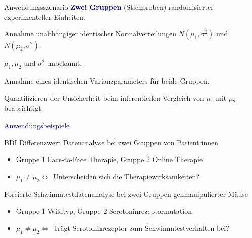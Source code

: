 \documentclass[
  8pt,
  ignorenonframetext,
]{beamer}
\providecommand{\tightlist}{%
  \setlength{\itemsep}{0pt}\setlength{\parskip}{0pt}}
\begin{document}
\begin{frame}{Anwendungsszenario}
\protect\hypertarget{anwendungsszenario-6}{}
\textbf{\textcolor{darkblue}{Zwei Gruppen}} (Stichproben) randomisierter
experimenteller Einheiten.

Annahme unabhängiger identischer Normalverteilungen
\(N(\mu_1,\sigma^2)\) und \(N(\mu_2,\sigma^2)\).

\(\mu_1,\mu_2\) und \(\sigma^2\) unbekannt.

Annahme eines identischen Varianzparameters für beide Gruppen.

Quantifizieren der Unsicherheit beim inferentiellen Vergleich von
\(\mu_1\) mit \(\mu_2\) beabsichtigt.

\vspace{2mm}

\textcolor{darkblue}{Anwendungsbeispiele}

\small

BDI Differenzwert Datenanalyse bei zwei Gruppen von Patient:innen
\vspace{-2mm}

\begin{itemize}
\tightlist
\item
  Gruppe 1 Face-to-Face Therapie, Gruppe 2 Online Therapie
\item
  \(\mu_1 \neq \mu_2 \Leftrightarrow\) Unterscheiden sich die
  Therapiewirksamkeiten?
\end{itemize}

Forcierte Schwimmtestdatenanalyse bei zwei Gruppen genmanipulierter
Mäuse \vspace{-2mm}

\begin{itemize}
\tightlist
\item
  Gruppe 1 Wildtyp, Gruppe 2 Serotoninrezeptormutation
\item
  \(\mu_1 \neq \mu_2 \Leftrightarrow\) Trägt Serotoninrezeptor zum
  Schwimmtestverhalten bei?
\end{itemize}
\end{frame}
\end{document}
